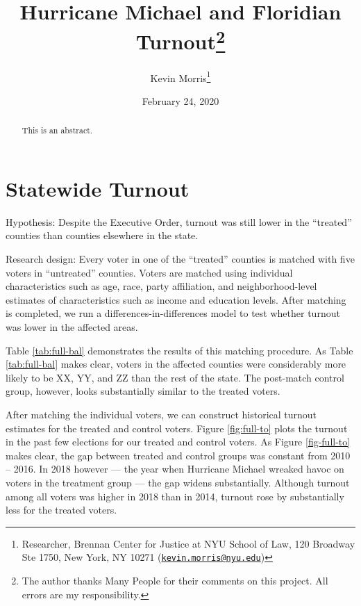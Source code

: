 \documentclass[
  12pt,
]{article}
\title{Hurricane Michael and Floridian Turnout\thanks{The author thanks Many People for their comments on this project. All errors are my responsibility.}}
\author{Kevin Morris\footnote{Researcher, Brennan Center for Justice at NYU School of Law, 120 Broadway Ste 1750, New York, NY 10271 (\href{mailto:kevin.morris@nyu.edu}{\nolinkurl{kevin.morris@nyu.edu}})}}
\date{February 24, 2020}
\begin{document}
\maketitle
\begin{abstract}
This is an abstract.
\end{abstract}

\pagebreak


\hypertarget{statewide-turnout}{%
\section*{Statewide Turnout}\label{statewide-turnout}}

Hypothesis: Despite the Executive Order, turnout was still lower in the ``treated'' counties than counties elsewhere in the state.

Research design: Every voter in one of the ``treated'' counties is matched with five voters in ``untreated'' counties. Voters are matched using individual characteristics such as age, race, party affiliation, and neighborhood-level estimates of characteristics such as income and education levels. After matching is completed, we run a differences-in-differences model to test whether turnout was lower in the affected areas.

Table \ref{tab:full-bal} demonstrates the results of this matching procedure. As Table \ref{tab:full-bal} makes clear, voters in the affected counties were considerably more likely to be XX, YY, and ZZ than the rest of the state. The post-match control group, however, looks substantially similar to the treated voters.

After matching the individual voters, we can construct historical turnout estimates for the treated and control voters. Figure \ref{fig:full-to} plots the turnout in the past few elections for our treated and control voters. As Figure \ref{fig-full-to} makes clear, the gap between treated and control groups was constant from 2010 -- 2016. In 2018 however --- the year when Hurricane Michael wreaked havoc on voters in the treatment group --- the gap widens substantially. Although turnout among all voters was higher in 2018 than in 2014, turnout rose by substantially less for the treated voters.
\end{document}
